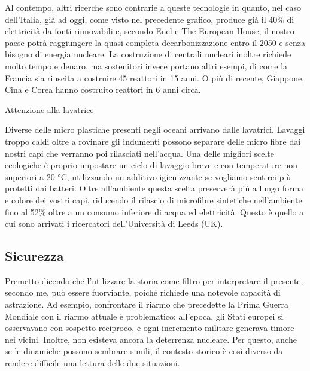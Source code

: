 \documentclass[12pt]{book} %
\begin{document}
Al contempo, altri ricerche sono contrarie a queste tecnologie in quanto, nel caso dell'Italia, già
ad oggi, come visto nel precedente grafico, produce già il 40\% di elettricità da fonti
rinnovabili
 e, secondo Enel e The
European House, il nostro paese potrà raggiungere la quasi completa decarbonizzazione entro il 2050 e senza bisogno di
energia
nucleare.
La costruzione di centrali nucleari inoltre richiede molto tempo e denaro, ma sostenitori invece portano altri esempi, di come la Francia sia riuscita a costruire 45 reattori in 15 anni. O più di recente, Giappone, Cina e Corea hanno costruito reattori in 6 anni circa.

\begin{mdframed}[linewidth=1pt]
Attenzione alla lavatrice

Diverse delle micro plastiche presenti negli oceani arrivano dalle lavatrici. Lavaggi troppo caldi oltre a rovinare
gli indumenti possono separare delle micro fibre dai nostri capi che verranno poi rilasciati
nell'acqua. Una delle migliori scelte ecologiche è proprio impostare un ciclo di lavaggio breve e
con temperature non superiori a 20 °C, utilizzando un additivo igienizzante se vogliamo sentirci più protetti dai
batteri. Oltre all'ambiente questa scelta preserverà più a lungo forma e colore dei vostri capi,
riducendo il rilascio di microfibre sintetiche nell'ambiente fino al 52\% oltre a un consumo inferiore di acqua ed
elettricità. Questo è quello a cui sono arrivati i ricercatori dell'Università di Leeds
(UK).
\end{mdframed}

\subsection{Sicurezza}
Premetto dicendo che l'utilizzare la storia come filtro per interpretare il presente, secondo me, può essere fuorviante, poiché richiede una notevole capacità di astrazione. Ad esempio, confrontare il riarmo che precedette la Prima Guerra Mondiale con il riarmo attuale è problematico: all’epoca, gli Stati europei si osservavano con sospetto reciproco, e ogni incremento militare generava timore nei vicini. Inoltre, non esisteva ancora la deterrenza nucleare. Per questo, anche se le dinamiche possono sembrare simili, il contesto storico è così diverso da rendere difficile una lettura delle due situazioni. 
\end{document}

